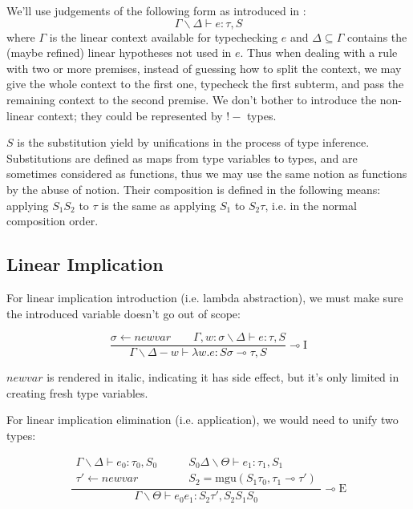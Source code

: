 \documentclass{article}
\newcommand{\mgu}[2]{\mathrm{mgu}(#1, #2)}
\newcommand{\newvar}{\mathit{newvar}}
\begin{document}
We'll use judgements of the following form as introduced in \cite[section~6.2]{pfenning02}:
\begin{displaymath}
  \Gamma \backslash \Delta \vdash e : \tau, S
\end{displaymath}
where $\Gamma$ is the linear context available for typechecking $e$ and $\Delta \subseteq \Gamma$ contains the (maybe refined) linear hypotheses not used in $e$. Thus when dealing with a rule with two or more premises, instead of guessing how to split the context, we may give the whole context to the first one, typecheck the first subterm, and pass the remaining context to the second premise. We don't bother to introduce the non-linear context; they could be represented by $!-$ types.

$S$ is the substitution yield by unifications in the process of type inference. Substitutions are defined as maps from type variables to types, and are sometimes considered as functions, thus we may use the same notion as functions by the abuse of notion. Their composition is defined in the following means: applying $S_1 S_2$ to $\tau$ is the same as applying $S_1$ to $S_2 \tau$, i.e. in the normal composition order.

\subsection{Linear Implication}

For linear implication introduction (i.e. lambda abstraction), we must make sure the introduced variable doesn't go out of scope:

\begin{displaymath}
  \frac
    {\sigma \leftarrow \newvar \qquad \Gamma, w : \sigma \backslash \Delta \vdash e : \tau, S}
    {\Gamma \backslash \Delta - w \vdash \lambda w. e : S \sigma \multimap \tau, S} 
  \multimap \mathrm{I}
\end{displaymath}

$\newvar$ is rendered in italic, indicating it has side effect, but it's only limited in creating fresh type variables.

For linear implication elimination (i.e. application), we would need to unify two types:

\begin{displaymath}
  \frac
    {\begin{array}{ll}
      \Gamma \backslash \Delta \vdash e_0 : \tau_0, S_0 \qquad &
      S_0 \Delta \backslash \Theta \vdash e_1 : \tau_1, S_1 \\
      \tau' \leftarrow \newvar \qquad &
      S_2 = \mgu{S_1 \tau_0}{\tau_1 \multimap \tau'}
     \end{array}}
    {\Gamma \backslash \Theta \vdash e_0 e_1 : S_2 \tau', S_2 S_1 S_0} 
  \multimap \mathrm{E}
\end{displaymath}
\end{document}
